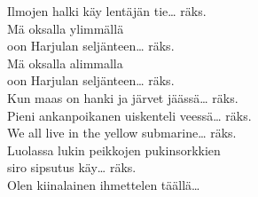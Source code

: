 
            Ilmojen halki käy lentäjän tie…  räks. \\
            Mä oksalla ylimmällä \\
            oon Harjulan seljänteen…  räks. \\
            Mä oksalla alimmalla \\
            oon Harjulan seljänteen…  räks. \\
            Kun maas on hanki ja järvet jäässä…  räks. \\
            Pieni ankanpoikanen uiskenteli veessä…  räks. \\
            We all live in the yellow submarine…  räks. \\
            Luolassa lukin peikkojen pukinsorkkien \\
            siro sipsutus käy…  räks. \\
            Olen kiinalainen ihmettelen täällä… \\
